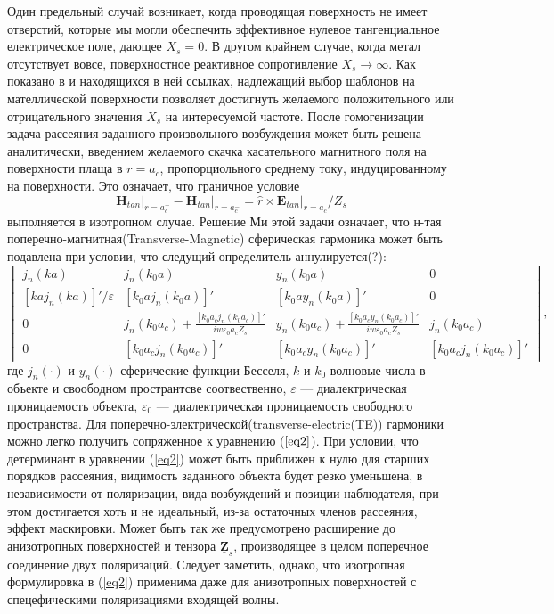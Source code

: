 \documentclass[12pt,a4paper]{article}
\begin{document}
Один предельный случай возникает, когда проводящая поверхность не имеет отверстий, которые мы могли
обеспечить эффективное нулевое тангенциальное електрическое поле, дающее $X_s = 0$. В другом крайнем
случае, когда метал отсутствует вовсе, поверхностное 
реактивное сопротивление $X_s \to \infty$.
Как показано в \cite{14} и находящихся в ней ссылках, надлежащий выбор шаблонов на мателлической
поверхности позволяет достигнуть желаемого положительного или отрицательного значения $X_s$ на 
интересуемой частоте. После гомогенизации задача рассеяния заданного произвольного возбуждения может
быть решена аналитически, введением желаемого скачка касательного магнитного поля на поверхности плаща
в $r=a_c$, пропорциольного среднему току, индуцированному на поверхности. Это означает, что граничное
условие 
\begin{equation}
\left.\textbf{H}_{tan}\right|_{r=a_c^+} - \left.\textbf{H}_{tan}\right|_{r=a_c^-} = 
\hat{r} \times \left.\textbf{E}_{tan}\right|_{r=a_c} / Z_s
\end{equation} 	
выполняется в изотропном случае. Решение Ми этой задачи означает, что н-тая 
поперечно-магнитная(Transverse-Magnetic) сферическая гармоника может быть подавлена при условии,
что следущий определитель аннулируется(?):
\begin{equation}\label{eq2}
\begin{vmatrix}
j_n(ka) & j_n(k_0a) & y_n(k_0a) & 0\\
[kaj_n(ka)]'/\varepsilon & [k_0aj_n(k_0a)]' & [k_0ay_n(k_0a)]' & 0\\
0 & j_n(k_0a_c)+\frac{[k_0a_cj_n(k_0a_c)]'}{iw\varepsilon_0a_cZ_s} &
y_n(k_0a_c) + \frac{[k_0a_cy_n(k_0a_c)]'}{iw\varepsilon_0a_cZ_s} & j_n(k_0a_c)\\
0 & [k_0a_cj_n(k_0a_c)]' & [k_0a_cy_n(k_0a_c)]' & [k_0a_cj_n(k_0a_c)]'
\end{vmatrix},
\end{equation}
где $j_n(\cdot)$ и $y_n(\cdot)$ сферические функции Бесселя, $k$ и $k_0$ волновые числа в объекте и
своободном пространтсве соотвественно, $\varepsilon$ --- диалектрическая проницаемость объекта,
$\varepsilon_0$ --- диалектрическая проницаемость свободного пространства.
Для поперечно-электрической(transverse-electric(TE)) гармоники можно легко 
получить сопряженное к уравнению ($\ref{eq2}$). При условии, что детерминант в уравнении 
(\ref{eq2}) может быть приближен к нулю для старших порядков рассеяния, видимость заданного
объекта будет резко уменьшена, в независимости от поляризации, вида возбуждений и позиции
наблюдателя, при этом достигается хоть и не идеальный, из-за остаточных членов рассеяния,
эффект маскировки. Может быть так же предусмотрено расширение до анизотропных поверхностей
и тензора $\underline{\textbf{Z}}_s$, производящее в целом поперечное соединение двух 
поляризаций. Следует заметить, однако, что изотропная формулировка в (\ref{eq2}) применима
даже для анизотропных поверхностей с спецефическими поляризациями входящей волны.
\end{document}
